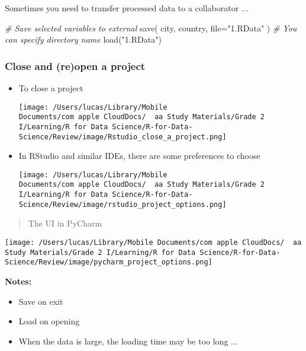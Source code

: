 \documentclass[
]{article}
\newenvironment{Shaded}{}{}
\newcommand{\AttributeTok}[1]{\textcolor[rgb]{0.49,0.56,0.16}{#1}}
\newcommand{\CommentTok}[1]{\textcolor[rgb]{0.38,0.63,0.69}{\textit{#1}}}
\newcommand{\FunctionTok}[1]{\textcolor[rgb]{0.02,0.16,0.49}{#1}}
\newcommand{\NormalTok}[1]{#1}
\newcommand{\StringTok}[1]{\textcolor[rgb]{0.25,0.44,0.63}{#1}}
\begin{document}
Sometimes you need to transfer processed data to a collaborator ...

\begin{Shaded}
\begin{Highlighting}[]
\CommentTok{\# Save selected variables to external}
\FunctionTok{save}\NormalTok{(}
\NormalTok{  city, }
\NormalTok{  country, }
  \AttributeTok{file=}\StringTok{"1.RData"}
\NormalTok{)}
\CommentTok{\# You can specify directory name}
\FunctionTok{load}\NormalTok{(}\StringTok{"1.RData"}\NormalTok{)}
\end{Highlighting}
\end{Shaded}

\hypertarget{close-and-reopen-a-project}{%
\subsubsection{Close and (re)open a
project}\label{close-and-reopen-a-project}}

\begin{itemize}
\item
  To close a project

  \texttt{[image: /Users/lucas/Library/Mobile Documents/com~apple~CloudDocs/~~aa Study Materials/Grade 2 I/Learning/R for Data Science/R-for-Data-Science/Review/image/Rstudio\_close\_a\_project.png]}
\item
  In RStudio and similar IDEs, there are some preferences to choose

  \texttt{[image: /Users/lucas/Library/Mobile Documents/com~apple~CloudDocs/~~aa Study Materials/Grade 2 I/Learning/R for Data Science/R-for-Data-Science/Review/image/rstudio\_project\_options.png]}
\end{itemize}

\begin{quote}
The UI in PyCharm
\end{quote}

\texttt{[image: /Users/lucas/Library/Mobile Documents/com~apple~CloudDocs/~~aa Study Materials/Grade 2 I/Learning/R for Data Science/R-for-Data-Science/Review/image/pycharm\_project\_options.png]}

\textbf{Notes:}

\begin{itemize}
\item
  Save on exit
\item
  Load on opening
\item
  When the data is large, the loading time may be too long ...
\end{itemize}
\end{document}

